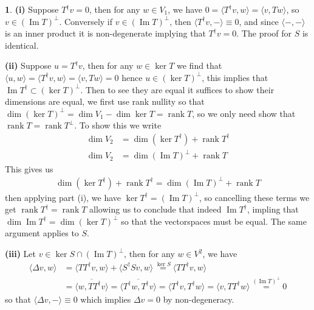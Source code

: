 \documentclass[10.5pt]{article}
\theoremstyle{definition}
\newtheorem{pb}{}
\newcommand{\gen}[1]{\langle#1\rangle}
\begin{document}
    \begin{pb}
        \textbf{(i)} Suppose \(T^\dagger v = 0\), then for any \(w \in V_1\), we have \(0 = \gen{T^\dagger v, w} = \gen{v, Tw}\), so \(v \in (\operatorname{Im} T)^\perp\).  Conversely if \(v \in (\operatorname{Im} T)^\perp\), then \(\gen{T^\dagger v, -} \equiv 0\), and since \(\gen{-,-}\) is an inner product it is non-degenerate implying that \(T^\dagger v = 0\). The proof for \(S\) is identical.

        \textbf{(ii)} Suppose \(u = T^\dagger v\), then for any \(w \in \ker T\) we find that \(\gen{u,w} = \gen{T^\dagger v,w} = \gen{v,Tw} = 0\) hence \(u \in (\ker T)^\perp\), this implies that \(\operatorname{Im}T^\dagger \subset (\ker T)^{\perp}\). Then to see they are equal it suffices to show their dimensions are equal, we first use rank nullity so that \(\dim (\ker T)^\perp = \dim V_1 - \dim \ker T = \operatorname{rank} T\), so we only need show that \(\operatorname{rank} T = \operatorname{rank} T^\perp\). To show this we write
        \begin{align}
            \dim V_2 &= \dim(\ker T^\dagger) + \operatorname{rank}T^\dagger \\
            \dim V_2 &= \dim(\operatorname{Im} T)^\perp + \operatorname{rank} T
        \end{align}
        This gives us
        \begin{align}
            \dim(\ker T^\dagger) + \operatorname{rank}T^\dagger = \dim(\operatorname{Im} T)^\perp + \operatorname{rank} T
        \end{align}
        then applying part (i), we have \(\ker T^\dagger = (\operatorname{Im} T)^\perp\), so cancelling these terms we get \(\operatorname{rank} T^\dagger = \operatorname{rank} T\) allowing us to conclude that indeed \(\operatorname{Im}T^\dagger\), impling that \(\dim \operatorname{Im} T^\dagger = \dim (\ker T)^\perp\) so that the vectorspaces must be equal. The same argument applies to \(S\).

        \textbf{(iii)} Let \(v \in \ker S \cap (\operatorname{Im} T)^\perp\), then for any \(w \in V^2\), we have
        \begin{align}
            \gen{\Delta v, w} &= \gen{TT^{\dagger}v,w} + \gen{S^\dagger S v, w} \overset{\ker S}{=} \gen{TT^{\dagger}v,w}\\ 
            &= \overline{\gen{w,TT^{\dagger}v}} = \overline{\gen{T^\dagger w, T^\dagger v}} = \gen{T^\dagger v, T^\dagger w} = \gen{v,TT^\dagger w} \overset{(\operatorname{Im} T)^\perp}{=} 0
        \end{align}
        so that \(\gen{\Delta v,-} \equiv 0\) which implies \(\Delta v = 0\) by non-degeneracy.


\end{pb}
\end{document}
